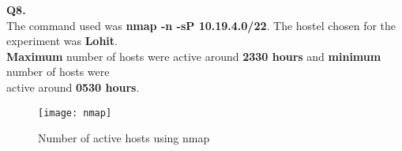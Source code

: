 \documentclass[12pt]{report}
\begin{document}
	\vspace*{10px}
	\large{\textbf{Q8.}}
	\linebreak[1]
	\normalsize{}
	\\
	\hspace*{1cm}The command used was \textbf{nmap -n -sP 10.19.4.0/22}. The hostel chosen for the experiment was \textbf{Lohit}.\\[1pt] \hspace*{1cm}\textbf{Maximum} number of hosts were active around \textbf{2330 hours} and \textbf{minimum} number of hosts were\\[1pt] \hspace*{1cm} active around \textbf{0530 hours}.
	\begin{figure}[H]
		\centering
		\texttt{[image: nmap]}
		\caption{Number of active hosts using nmap}
	\end{figure}
\end{document}
